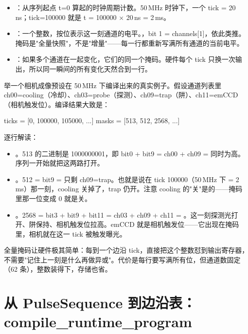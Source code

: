 \documentclass[11pt,oneside,openany]{book}
\begin{document}
\begin{itemize}
\item {}：从序列起点 t=0 算起的时钟周期计数。50\,MHz 时钟下，一个 tick = 20\,ns；tick=100000 就是 t = 100000 × 20\,ns = 2\,ms。
\item {}：一个整数，按位表示这一刻通道的电平。，bit 1 = channels[1]，依此类推。掩码是"全量快照"，不是"增量"——每一行都重新写满所有通道的当前电平。
\item {}：如果多个通道在一起变化，它们的同一个掩码。硬件每个 tick 只换一次输出，所以同一瞬间的所有变化天然合到一行。
\end{itemize}

举一个相机成像预设在 50\,MHz 下编译出来的真实例子。假设通道列表里 ch00=cooling（冷却）、ch03=probe（探测）、ch09=trap（阱）、ch11=emCCD（相机触发位）。编译结果大致是：

\begin{codeblock}[text]
ticks = [0,      100000, 105000, ...]
masks = [513,    512,    2568,   ...]
\end{codeblock}

逐行解读：
\begin{itemize}
\item {}。513 的二进制是 1000000001，即 bit0 + bit9 = ch00 + ch09 =  同时为高。序列一开始就把这两路打开。
\item {}。512 = bit9 = 只剩 ch09=trap。也就是说在 tick 100000（50\,MHz 下 = 2\,ms）那一刻，cooling 关掉了，trap 仍开。注意 cooling 的"关"是的——掩码里那一位变成 0 就是关。
\item {}。2568 = bit3 + bit9 + bit11 = ch03 + ch09 + ch11 = 。这一刻探测光打开、阱保持、相机触发位拉高。emCCD 就是相机触发位——它出现在掩码里，相机就在这一 tick 被触发曝光。
\end{itemize}

\begin{notebox}[为什么掩码是全量而不是增量]
全量掩码让硬件极其简单：每到一个边沿 tick，直接把这个整数怼到输出寄存器，不需要"记住上一刻是什么再做异或"。代价是每行要写满所有位，但通道数固定（62 条），整数装得下，存储也省。
\end{notebox}

\section{从 PulseSequence 到边沿表：compile\_runtime\_program}
\end{document}
